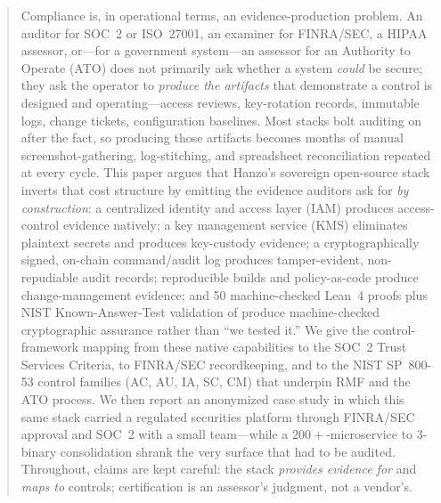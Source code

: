 \documentclass[11pt,letterpaper]{article}
\begin{document}
\makecover

\begin{abstract}
Compliance is, in operational terms, an evidence-production problem. An auditor
for SOC~2 or ISO~27001, an examiner for FINRA/SEC, a HIPAA assessor, or---for a
government system---an assessor for an Authority to
Operate (ATO) does not primarily ask whether a system \emph{could} be secure; they
ask the operator to \emph{produce the artifacts} that demonstrate a control is
designed and operating---access reviews, key-rotation records, immutable logs,
change tickets, configuration baselines. Most stacks bolt auditing on after the
fact, so producing those artifacts becomes months of manual screenshot-gathering,
log-stitching, and spreadsheet reconciliation repeated at every cycle. This paper
argues that Hanzo's sovereign open-source stack inverts that cost structure by
emitting the evidence auditors ask for \emph{by construction}: a centralized
identity and access layer (IAM) produces access-control evidence natively; a key
management service (KMS) eliminates plaintext secrets and produces key-custody
evidence; a cryptographically signed, on-chain command/audit log produces
tamper-evident, non-repudiable audit records; reproducible builds and policy-as-code
produce change-management evidence; and 50 machine-checked Lean~4 proofs plus NIST
Known-Answer-Test validation of  produce machine-checked
cryptographic assurance rather than ``we tested it.'' We give the control-framework
mapping from these native capabilities to the SOC~2 Trust Services Criteria, to
FINRA/SEC recordkeeping, and to the NIST SP~800-53 control families (AC, AU, IA,
SC, CM) that underpin RMF and the ATO process. We then report an anonymized case
study in which this same stack carried a regulated securities platform through
FINRA/SEC approval and SOC~2 with a small team---while a $200{+}$-microservice to
3-binary consolidation shrank the very surface that had to be audited. Throughout,
claims are kept careful: the stack \emph{provides evidence for} and \emph{maps to}
controls; certification is an assessor's judgment, not a vendor's.
\end{abstract}
\end{document}
